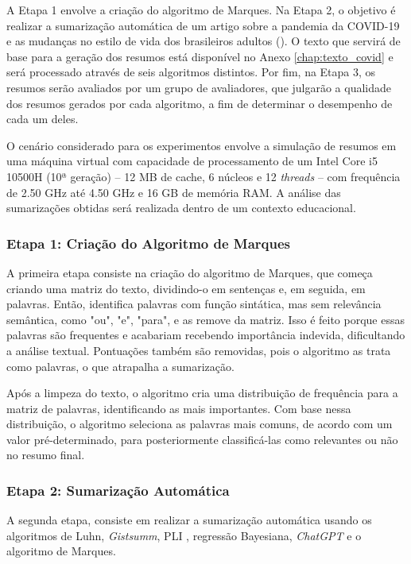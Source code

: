 A Etapa 1 envolve a criação do algoritmo de Marques. Na Etapa 2, o objetivo é realizar a sumarização automática de um artigo sobre a pandemia da COVID-19 e as mudanças no estilo de vida dos brasileiros adultos (\cite{MALTA2020}). O texto que servirá de base para a geração dos resumos está disponível no Anexo \ref{chap:texto_covid} e será processado através de seis algoritmos distintos. Por fim, na Etapa 3, os resumos serão avaliados por um grupo de avaliadores, que julgarão a qualidade dos resumos gerados por cada algoritmo, a fim de determinar o desempenho de cada um deles.

O cenário considerado para os experimentos envolve a simulação de resumos em uma máquina virtual com capacidade de processamento de um Intel Core i5 10500H (10ª geração) – 12 MB de cache, 6 núcleos e 12 \textit{threads} – com frequência de 2.50 GHz até 4.50 GHz e 16 GB de memória RAM. A análise das sumarizações obtidas será realizada dentro de um contexto educacional.

\subsubsection{Etapa 1: Criação do Algoritmo de Marques}
\label{chap:primeira-etapa}

A primeira etapa consiste na criação do algoritmo de Marques, que começa criando uma matriz do texto, dividindo-o em sentenças e, em seguida, em palavras. Então, identifica palavras com função sintática, mas sem relevância semântica, como "ou", "e", "para", e as remove da matriz. Isso é feito porque essas palavras são frequentes e acabariam recebendo importância indevida, dificultando a análise textual. Pontuações também são removidas, pois o algoritmo as trata como palavras, o que atrapalha a sumarização.

Após a limpeza do texto, o algoritmo cria uma distribuição de frequência para a matriz de palavras, identificando as mais importantes. Com base nessa distribuição, o algoritmo seleciona as palavras mais comuns, de acordo com um valor pré-determinado, para posteriormente classificá-las como relevantes ou não no resumo final.

\subsubsection{Etapa 2: Sumarização Automática}
\label{chap:segunda-etapa}

A segunda etapa, consiste em realizar a sumarização automática usando os algoritmos de Luhn, \textit{Gistsumm}, PLI \cite{oliveira2018sumarizaccao}, regressão Bayesiana, \textit{ChatGPT} e o algoritmo de Marques.

